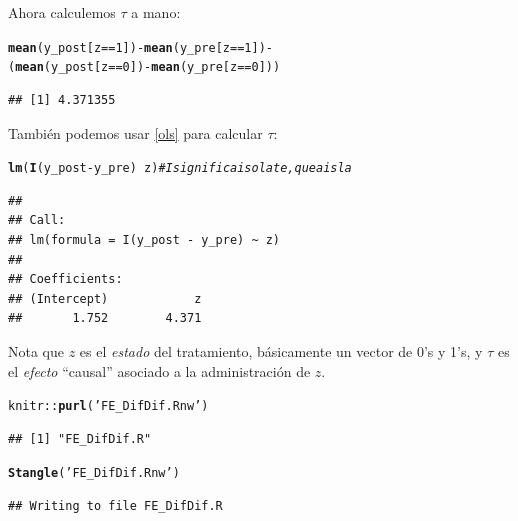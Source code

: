 \documentclass[onesided]{article}\usepackage[]{graphicx}\usepackage[]{color}
\makeatletter
\newcommand{\hlnum}[1]{\textcolor[rgb]{0.686,0.059,0.569}{#1}}%
\newcommand{\hlstr}[1]{\textcolor[rgb]{0.192,0.494,0.8}{#1}}%
\newcommand{\hlcom}[1]{\textcolor[rgb]{0.678,0.584,0.686}{\textit{#1}}}%
\newcommand{\hlopt}[1]{\textcolor[rgb]{0,0,0}{#1}}%
\newcommand{\hlstd}[1]{\textcolor[rgb]{0.345,0.345,0.345}{#1}}%
\newcommand{\hlkwd}[1]{\textcolor[rgb]{0.737,0.353,0.396}{\textbf{#1}}}%
\newenvironment{kframe}{%
 \def\at@end@of@kframe{}%
 \ifinner\ifhmode%
  \def\at@end@of@kframe{\end{minipage}}%
  \begin{minipage}{\columnwidth}%
 \fi\fi%
 \def\FrameCommand##1{\hskip\@totalleftmargin \hskip-\fboxsep
 \colorbox{shadecolor}{##1}\hskip-\fboxsep
     \hskip-\linewidth \hskip-\@totalleftmargin \hskip\columnwidth}%
 \MakeFramed {\advance\hsize-\width
   \@totalleftmargin\z@ \linewidth\hsize
   \@setminipage}}%
 {\par\unskip\endMakeFramed%
 \at@end@of@kframe}
\newenvironment{knitrout}{}{} %
\makeatother
\begin{document}
Ahora calculemos $\tau$ a mano:

\begin{knitrout}
\color{fgcolor}\begin{kframe}
\begin{alltt}
\hlkwd{mean}\hlstd{(y_post[z} \hlopt{==} \hlnum{1}\hlstd{])} \hlopt{-} \hlkwd{mean}\hlstd{(y_pre[z} \hlopt{==} \hlnum{1}\hlstd{])} \hlopt{-}
\hlstd{(}\hlkwd{mean}\hlstd{(y_post[z} \hlopt{==} \hlnum{0}\hlstd{])} \hlopt{-} \hlkwd{mean}\hlstd{(y_pre[z} \hlopt{==} \hlnum{0}\hlstd{]))}
\end{alltt}
\begin{verbatim}
## [1] 4.371355
\end{verbatim}
\end{kframe}
\end{knitrout}

Tambi\'en podemos usar \autoref{ols} para calcular $\tau$:

\begin{knitrout}
\color{fgcolor}\begin{kframe}
\begin{alltt}
\hlkwd{lm}\hlstd{(}\hlkwd{I}\hlstd{(y_post} \hlopt{-} \hlstd{y_pre)} \hlopt{~} \hlstd{z)} \hlcom{# I significa isolate, que aisla}
\end{alltt}
\begin{verbatim}
## 
## Call:
## lm(formula = I(y_post - y_pre) ~ z)
## 
## Coefficients:
## (Intercept)            z  
##       1.752        4.371
\end{verbatim}
\end{kframe}
\end{knitrout}

Nota que $z$ es el \emph{estado} del tratamiento, b\'asicamente un vector de 0's y 1's, y $\tau$ es el \emph{efecto} ``causal'' asociado a la administraci\'on de $z$. 




\begin{knitrout}
\color{fgcolor}\begin{kframe}
\begin{alltt}
\hlstd{knitr}\hlopt{::}\hlkwd{purl}\hlstd{(}\hlstr{'FE_DifDif.Rnw'}\hlstd{)}
\end{alltt}
\begin{verbatim}
## [1] "FE_DifDif.R"
\end{verbatim}
\begin{alltt}
\hlkwd{Stangle}\hlstd{(}\hlstr{'FE_DifDif.Rnw'}\hlstd{)}
\end{alltt}
\begin{verbatim}
## Writing to file FE_DifDif.R
\end{verbatim}
\end{kframe}
\end{knitrout}


\paragraph{}
\paragraph{}
\setcounter{page}{1}
\printbibliography
\end{document}
